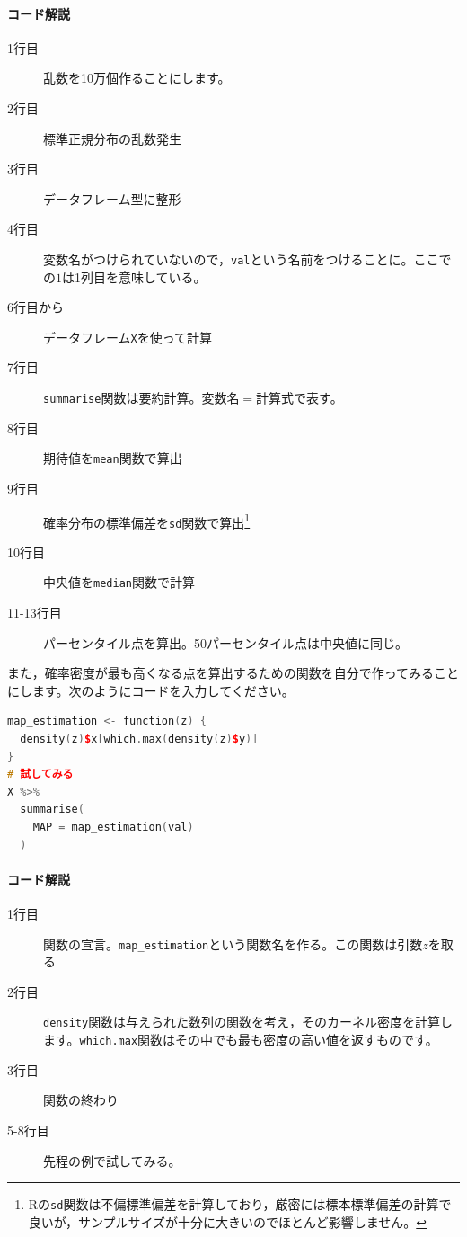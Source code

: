 \documentclass{ltjsbook}
\begin{document}
\paragraph{コード解説}
    \begin{description}
        \item[1行目] 乱数を10万個作ることにします。
        \item[2行目] 標準正規分布の乱数発生
        \item[3行目] データフレーム型に整形
        \item[4行目] 変数名がつけられていないので，\texttt{val}という名前をつけることに。ここでの$1$は1列目を意味している。
        \item[6行目から] データフレーム\texttt{X}を使って計算
        \item[7行目] \texttt{summarise}関数は要約計算。変数名$=$計算式で表す。
        \item[8行目] 期待値を\texttt{mean}関数で算出
        \item[9行目] 確率分布の標準偏差を\texttt{sd}関数で算出\footnote{Rの\texttt{sd}関数は不偏標準偏差を計算しており，厳密には標本標準偏差の計算で良いが，サンプルサイズが十分に大きいのでほとんど影響しません。}
        \item[10行目] 中央値を\texttt{median}関数で計算
        \item[11-13行目] パーセンタイル点を算出。50パーセンタイル点は中央値に同じ。
\end{description}

また，確率密度が最も高くなる点を算出するための関数を自分で作ってみることにします。次のようにコードを入力してください。
\begin{lstlisting}[language=c++,label={code::17_07},caption={確率分布の要約}]
map_estimation <- function(z) {
  density(z)$x[which.max(density(z)$y)]
}
# 試してみる
X %>%
  summarise(
    MAP = map_estimation(val)
  )

\end{lstlisting}
\paragraph{コード解説}
    \begin{description}
        \item[1行目] 関数の宣言。\verb|map_estimation|という関数名を作る。この関数は引数$z$を取る
        \item[2行目] \texttt{density}関数は与えられた数列の関数を考え，そのカーネル密度を計算します。\texttt{which.max}関数はその中でも最も密度の高い値を返すものです。
        \item[3行目] 関数の終わり
        \item[5-8行目] 先程の例で試してみる。
\end{description}
\end{document}
